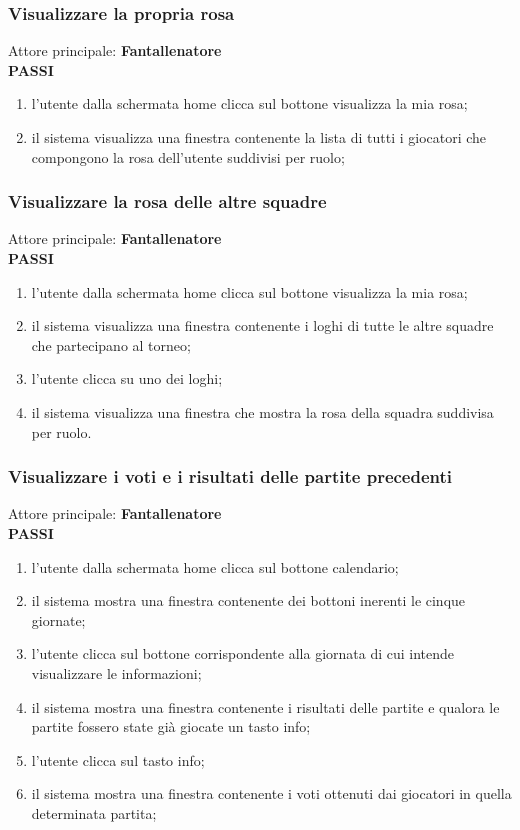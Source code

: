 \documentclass[12pt,a4paper]{article}
\begin{document}
\subsubsection{Visualizzare la propria rosa}
Attore principale: \textbf{Fantallenatore}\\
\newline
\textbf{PASSI}
\begin{enumerate}
\item l'utente dalla schermata home clicca sul bottone visualizza la mia rosa;
\item il sistema visualizza una finestra contenente la lista di tutti i giocatori che compongono la rosa dell'utente suddivisi per ruolo;
\end{enumerate}
\subsubsection{Visualizzare la rosa delle altre squadre}
Attore principale: \textbf{Fantallenatore}\\
\newline
\textbf{PASSI}
\begin{enumerate}
\item l'utente dalla schermata home clicca sul bottone visualizza la mia rosa;
\item il sistema visualizza una finestra contenente i loghi di tutte le altre squadre che partecipano al torneo;
\item l'utente clicca su uno dei loghi;
\item il sistema visualizza una finestra che mostra la rosa della squadra suddivisa per ruolo.
\end{enumerate}
\subsubsection{Visualizzare i voti e i risultati delle partite precedenti}
Attore principale: \textbf{Fantallenatore}\\
\newline
\textbf{PASSI}
\begin{enumerate}
\item l'utente dalla schermata home clicca sul bottone calendario;
\item il sistema mostra una finestra contenente dei bottoni inerenti le cinque giornate;
\item l'utente clicca sul bottone corrispondente alla giornata di cui intende visualizzare le informazioni;
\item il sistema mostra una finestra contenente i risultati delle partite e qualora le partite fossero state già giocate un tasto info;
\item l'utente clicca sul tasto info;
\item il sistema mostra una finestra contenente i voti ottenuti dai giocatori in quella determinata partita; 
\end{enumerate}
\end{document}
